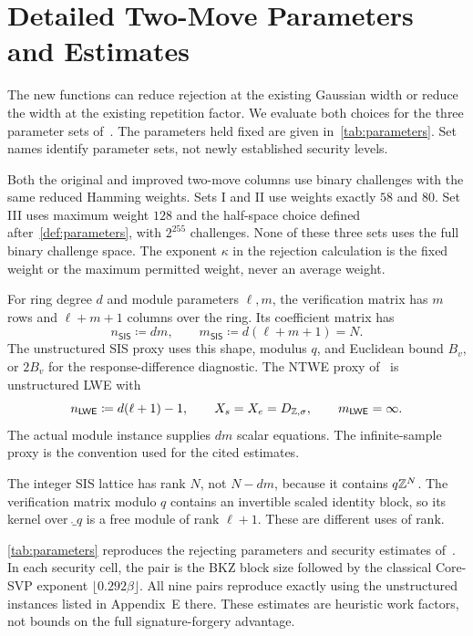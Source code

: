 \section{Detailed Two-Move Parameters and Estimates}
\label{sec:comparison}

The new functions can reduce rejection at the existing Gaussian width or reduce the width at the existing repetition factor. We evaluate both choices for the three parameter sets of~\cite[Table~1]{GartnerFull}. The parameters held fixed are given in~\cref{tab:parameters}. Set names identify parameter sets, not newly established security levels.

Both the original and improved two-move columns use binary challenges with the same reduced Hamming weights. Sets I and II use weights exactly $58$ and $80$. Set III uses maximum weight $128$ and the half-space choice defined after~\cref{def:parameters}, with $2^{255}$ challenges. None of these three sets uses the full binary challenge space. The exponent $\kappa$ in the rejection calculation is the fixed weight or the maximum permitted weight, never an average weight.

\begin{definition}
\label{def:lattice-dimensions}
For ring degree $d$ and module parameters $\ell,m$, the verification matrix has $m$ rows and $\ell+m+1$ columns over the ring. Its coefficient matrix has
\[
 n_{\mathsf{SIS}}\coloneqq dm,\qquad
 m_{\mathsf{SIS}}\coloneqq d(\ell+m+1)=N.
\]
The unstructured SIS proxy uses this shape, modulus $q$, and Euclidean bound $B_v$, or $2B_v$ for the response-difference diagnostic. The NTWE proxy of~\cite[Section~5.1 and Appendix~E]{GartnerFull} is unstructured LWE with
\[
 n_{\mathsf{LWE}}\coloneqq d(\ell+1)-1,\qquad
 X_s=X_e=D_{\mathbb{Z},\sigma},\qquad m_{\mathsf{LWE}}=\infty.
\]
The actual module instance supplies $dm$ scalar equations. The infinite-sample proxy is the convention used for the cited estimates.
\end{definition}

The integer SIS lattice has rank $N$, not $N-dm$, because it contains $q\mathbb{Z}^N$. The verification matrix modulo $q$ contains an invertible scaled identity block, so its kernel over $\ring_q$ is a free module of rank $\ell+1$. These are different uses of rank.

\cref{tab:parameters} reproduces the rejecting parameters and security estimates of~\cite[Table~1]{GartnerFull}. In each security cell, the pair is the BKZ block size followed by the classical Core-SVP exponent $\lfloor0.292\beta\rfloor$. All nine pairs reproduce exactly using the unstructured instances listed in Appendix~E there. These estimates are heuristic work factors, not bounds on the full signature-forgery advantage.

